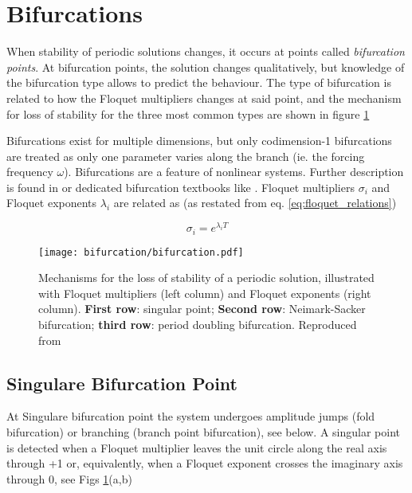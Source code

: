
\section{Bifurcations}
\label{sec:bifurcations}

When stability of periodic solutions changes, it occurs at points called
\textit{bifurcation points}.
At bifurcation points, the solution changes qualitatively, but knowledge
of the bifurcation type allows to predict the behaviour. The type of bifurcation
is related to how the Floquet multipliers changes at said point, and the
mechanism for loss of stability for the three most common types are shown in
figure \ref{fig:bifurcation}

Bifurcations exist for multiple dimensions, but only codimension-1 bifurcations
are treated as only one parameter varies along the branch (ie. the forcing
frequency $\omega$). Bifurcations are a feature of nonlinear systems. Further
description is found in \cite{juel2003a} or dedicated bifurcation textbooks like
\cite{kuznetsov2013}. Floquet multipliers $\sigma_i$ and Floquet exponents
$\lambda_i$ are related as (as restated from eq. \eqref{eq:floquet_relations})

\begin{equation}
  \sigma_i = e^{\lambda_i T}
\end{equation}

\begin{figure}
  \centering
  \texttt{[image: bifurcation/bifurcation.pdf]}
  \caption{Mechanisms for the loss of stability of a periodic solution,
    illustrated with Floquet multipliers (left column) and Floquet exponents
    (right column).
    \textbf{First row}: singular point;
    \textbf{Second row}: Neimark-Sacker bifurcation;
    \textbf{third row}: period doubling bifurcation.
    Reproduced from \cite{detroux2016_phd}}
  \label{fig:bifurcation}
\end{figure}

\subsection{Singulare Bifurcation Point}
\label{sec:singular_bif}

At Singulare bifurcation point the system undergoes amplitude jumps (fold
bifurcation) or branching (branch point bifurcation), see below.
A singular point is detected when a Floquet multiplier leaves the unit circle
along the real axis through +1 or, equivalently, when a Floquet exponent crosses
the imaginary axis through 0, see Figs \ref{fig:bifurcation}(a,b)

